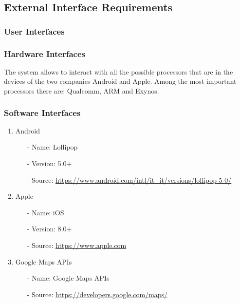 \subsection{External Interface Requirements}

	\subsubsection{User Interfaces}				
		
	
	\subsubsection{Hardware Interfaces}
		The system allows to interact with all the possible processors that are in the devices of the two companies Android and Apple. Among the most important processors there are: Qualcomm, ARM and Exynos.

	\subsubsection{Software Interfaces}
		\hfill		
		\begin{enumerate}
			\item Android
				\begin{itemize}
					\item[-] Name: Lollipop
					\item[-] Version: 5.0+
					\item[-] Source: \url{https://www.android.com/intl/it_it/versions/lollipop-5-0/}
				\end{itemize}
								
			\item Apple
				\begin{itemize}
					\item[-] Name: iOS
					\item[-] Version: 8.0+
					\item[-] Source: \url{https://www.apple.com}
				\end{itemize}
								
			\item Google Maps APIs
				\begin{itemize}
					\item[-] Name: Google Maps APIs
					\item[-] Source: \url{https://developers.google.com/maps/}
				\end{itemize}
		\end{enumerate}
			
